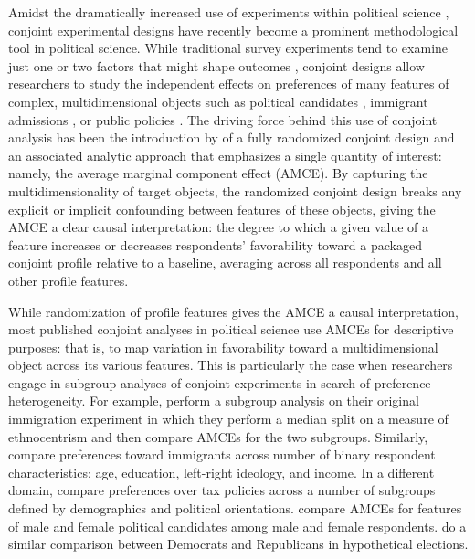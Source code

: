 \documentclass[a4paper,12pt]{article}\usepackage[]{graphicx}\usepackage[]{color}
\begin{document}
Amidst the dramatically increased use of experiments within political science \citep{Druckmanetal2006, Mutz2011}, conjoint experimental designs have recently become a prominent methodological tool in political science. While traditional survey experiments tend to examine just one or two factors that might shape outcomes \citep[see, for reviews,][]{GainesKuklinskiQuirk2007, Sniderman2011}, conjoint designs allow researchers to study the independent effects on preferences of many features of complex, multidimensional objects such as political candidates \citep{Campbelletal2016, TeeleKallaRosenbluth2018}, immigrant admissions \citep{HainmuellerHopkins2015, BansakHainmuellerHangartner2016, WrightLevyCitrin2016}, or public policies \citep{GallegoMarx2017, Hankinson2018}. The driving force behind this use of conjoint analysis has been the introduction by \citet{HainmuellerHopkinsYamamoto2014} of a fully randomized conjoint design and an associated analytic approach that emphasizes a single quantity of interest: namely, the average marginal component effect (AMCE). By capturing the multidimensionality of target objects, the randomized conjoint design breaks any explicit or implicit confounding between features of these objects, giving the AMCE a clear causal interpretation: the degree to which a given value of a feature increases or decreases respondents' favorability toward a packaged conjoint profile relative to a baseline, averaging across all respondents and all other profile features. 

While randomization of profile features gives the AMCE a causal interpretation, most published conjoint analyses in political science use AMCEs for descriptive purposes: that is, to map variation in favorability toward a multidimensional object across its various features. This is particularly the case when researchers engage in subgroup analyses of conjoint experiments in search of preference heterogeneity. For example, \citet{HainmuellerHopkinsYamamoto2014} perform a subgroup analysis on their original immigration experiment in which they perform a median split on a measure of ethnocentrism and then compare AMCEs for the two subgroups. Similarly, \citet{BansakHainmuellerHangartner2016} compare preferences toward immigrants across number of binary respondent characteristics: age, education, left-right ideology, and income. In a different domain, \citet{BallardRosaMartinScheve2016} compare preferences over tax policies across a number of subgroups defined by demographics and political orientations. \citet{TeeleKallaRosenbluth2018} compare AMCEs for features of male and female political candidates among male and female respondents. \citet{KirklandCoppock2017} do a similar comparison between Democrats and Republicans in hypothetical elections.
\end{document}
